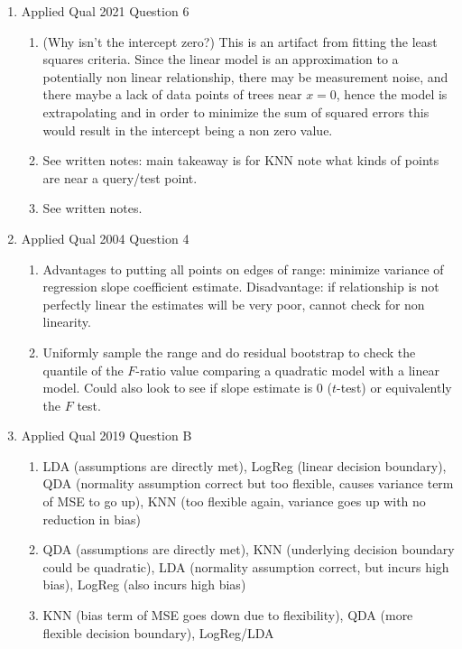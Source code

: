 \documentclass{article}
\begin{document}
\begin{itemize}
\begin{enumerate}[label=(\alph*)]
    \item Applied Qual 2021 Question 6
      \begin{enumerate}[label=(\arabic*)]
        \item (Why isn't the intercept zero?) This is an artifact from fitting the least squares criteria. Since the linear model is an approximation to a potentially non linear relationship, there may be measurement noise, and
          there maybe a lack of data points of trees near $x=0$, hence the model is extrapolating and in order to minimize the sum of squared errors this would result in the intercept being a non zero value.
        \item See written notes: main takeaway is for KNN note what kinds of points are near a query/test point.
        \item See written notes.
      \end{enumerate}
    \item Applied Qual 2004 Question 4
      \begin{enumerate}[label=(\arabic*)]
        \item Advantages to putting all points on edges of range: minimize variance of regression slope coefficient estimate. Disadvantage: if relationship is not perfectly linear the estimates will be very poor, cannot check for non linearity.
        \item Uniformly sample the range and do residual bootstrap to check the quantile of the $F$-ratio value comparing a quadratic model with a linear model. Could also look to see if slope estimate is 0 ($t$-test) or equivalently the $F$ test.
      \end{enumerate}
    \item Applied Qual 2019 Question B
      \begin{enumerate}[label=(\arabic*)]
        \item LDA (assumptions are directly met), LogReg (linear decision boundary), QDA (normality assumption correct but too flexible, causes variance term of MSE to go up), KNN (too flexible again, variance goes up with no reduction in bias)
        \item QDA (assumptions are directly met), KNN (underlying decision boundary could be quadratic), LDA (normality assumption correct, but incurs high bias), LogReg (also incurs high bias)
        \item KNN (bias term of MSE goes down due to flexibility), QDA (more flexible decision boundary), LogReg/LDA
      \end{enumerate}

\end{enumerate}
\end{itemize}
\end{document}

